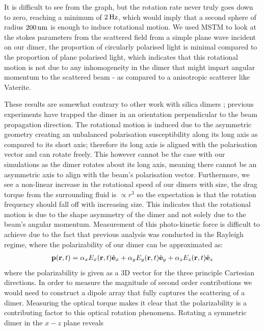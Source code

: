 It is difficult to see from the graph, but the rotation rate never
truly goes down to zero, reaching a minimum of $2\,{\rm Hz}$, which would
imply that a second sphere of radius $200\,{\rm nm}$ is enough to
induce rotational motion.  We used MSTM to look at the stokes
parameters from the scattered field from a simple plane wave incident
on our dimer, the proportion of circularly polarised light is minimal
compared to the proportion of plane polarised light, which indicates
that this rotational motion is not due to any inhomogeneity in the
dimer that might impart angular momentum to the scattered beam - as
compared to a anisotropic scatterer like Vaterite.

These results are somewhat contrary to other work with silica dimers
\cite{Ahn2018, Debuysschere2023,Reimann2018}; previous experiments
have trapped the dimer in an orientation perpendicular to the beam
propagation direction.  The rotational motion is induced due to the
asymmetric geometry creating an unbalanced polarisation susceptibility
along its long axis as compared to its short axis; therefore its long
axis is aligned with the polarisation vector and can rotate
freely\cite{Ahn2018}.  This however cannot be the case with our
simulations as the dimer rotates about its long axis, meaning there
cannot be an asymmetric axis to align with the beam's polarisation
vector. Furthermore, we see a non-linear increase in the rotational
speed of our dimers with size, the drag torque from the surrounding
fluid is $\propto r^3$ so the expectation is that the rotation
frequency should fall off with increasing size.  This indicates that
the rotational motion is due to the shape asymmetry of the dimer and
not solely due to the beam's angular momentum.  Measurement of this
photo-kinetic force is difficult to achieve due to the fact that
previous analysis was conducted in the Rayleigh regime, where the
polarizability of our dimer can be approximated as:
\begin{align}
  \bold{p}({\bf r},t)
  =
  \alpha_x E_x({\bf r},t)\hat{\bf e}_x
  + \alpha_yE_y({\bf r},t)\hat{\bf e}_y
  + \alpha_zE_z({\bf r},t)\hat{\bf e}_z
\end{align}
where the polarizability is given as a 3D vector for the three
principle Cartesian directions.  In order to measure the magnitude of
second order contributions we would need to construct a dipole array
that fully captures the scattering of a dimer. Measuring the optical torque 
makes it clear that the polarizability is a contributing factor to this optical 
rotation phenomena. Rotating a symmetric dimer in the $x-z$ plane reveals 
